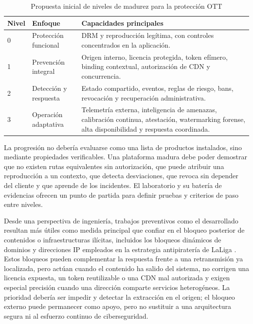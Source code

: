 \begin{table}[H]
\centering
\caption{Propuesta inicial de niveles de madurez para la protección OTT}
\label{tab:modelo-madurez-ott}
\begin{tabularx}{\textwidth}{p{}p{}Y}
\toprule
\textbf{Nivel} & \textbf{Enfoque} & \textbf{Capacidades principales} \\
 & Protección funcional & DRM y reproducción legítima, con controles concentrados en la aplicación. \\
1 & Prevención integral & Origen interno, licencia protegida, token efímero, binding contextual, autorización de CDN y concurrencia. \\
2 & Detección y respuesta & Estado compartido, eventos, reglas de riesgo, bans, revocación y recuperación administrativa. \\
3 & Operación adaptativa & Telemetría externa, inteligencia de amenazas, calibración continua, atestación, watermarking forense, alta disponibilidad y respuesta coordinada. \\
\bottomrule
\end{tabularx}
\end{table}

La progresión no debería evaluarse como una lista de productos instalados, sino mediante propiedades verificables. Una plataforma madura debe poder demostrar que no existen rutas equivalentes sin autorización, que puede atribuir una reproducción a un contexto, que detecta desviaciones, que revoca sin depender del cliente y que aprende de los incidentes. El laboratorio y su batería de evidencias ofrecen un punto de partida para definir pruebas y criterios de paso entre niveles.

Desde una perspectiva de ingeniería, trabajos preventivos como el desarrollado resultan más útiles como medida principal que confiar en el bloqueo posterior de contenidos o infraestructuras ilícitas, incluidos los bloqueos dinámicos de dominios y direcciones IP empleados en la estrategia antipiratería de LaLiga \cite{laliga2025bloqueos}. Estos bloqueos pueden complementar la respuesta frente a una retransmisión ya localizada, pero actúan cuando el contenido ha salido del sistema, no corrigen una licencia expuesta, un token reutilizable o una CDN mal autorizada y exigen especial precisión cuando una dirección comparte servicios heterogéneos. La prioridad debería ser impedir y detectar la extracción en el origen; el bloqueo externo puede permanecer como apoyo, pero no sustituir a una arquitectura segura ni al esfuerzo continuo de ciberseguridad.
